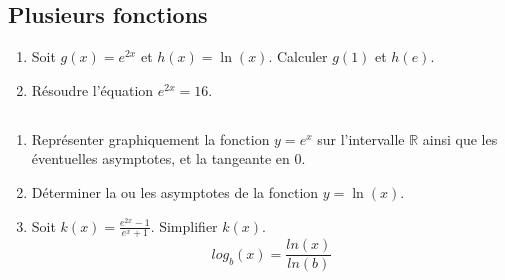 \documentclass[12pt,a4paper,fleqn]{article}
\begin{document}
\subsection{Plusieurs fonctions}
\begin{enumerate}
    \item  Soit \(g(x) = e^{2x}\) et \(h(x) = \ln(x)\). Calculer \(g(1)\) et \(h(e)\).
    \item  Résoudre l'équation \(e^{2x} = 16\).
\end{enumerate}
\subsection{}
\begin{enumerate}
    \item  Représenter graphiquement la fonction \(y = e^x\) sur l'intervalle \(\mathbb{R}\) ainsi que les éventuelles asymptotes, et la tangeante en 0.
\item  Déterminer la ou les asymptotes de la fonction \(y = \ln(x)\).
\item  Soit \(k(x) = \frac{e^{2x} - 1}{e^x + 1}\). Simplifier \(k(x)\).
$$log_b(x)=\frac{ln(x)}{ln(b)}$$
\end{enumerate}
\end{document}
